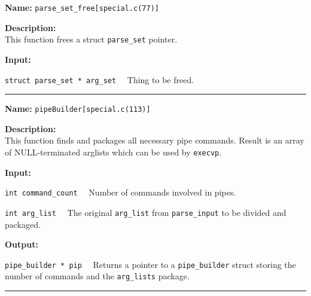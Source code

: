 \documentclass[11pt,a4paper]{article}
\begin{document}
\begin{description}
\item \textbf{Name:} 
\verb|parse_set_free[special.c(77)]|

\item \textbf{Description:}\\
 This function frees a struct \verb|parse_set| pointer.

\item \textbf{Input:}
\begin{description}
\item \verb|struct parse_set * arg_set|~~ Thing to be freed.
\end{description}
\end{description}\hrule

\begin{description}
\item \textbf{Name:} 
\verb|pipeBuilder[special.c(113)]|

\item \textbf{Description:}\\
 This function finds and packages all necessary pipe commands. Result is an array of NULL-terminated arglists which can be used by \texttt{execvp}. 

\item \textbf{Input:}
\begin{description}
\item \verb|int command_count|~~ Number of commands involved in pipes.
\item \verb|int arg_list|~~ The original \verb|arg_list| from \verb|parse_input| to be divided and packaged.
\end{description}

\item \textbf{Output:}
\begin{description}
\item \verb|pipe_builder * pip|~~ Returns a pointer to a \verb|pipe_builder| struct storing the number of commands and the \verb|arg_lists| package.
\end{description}
\end{description}\hrule
\end{document}
